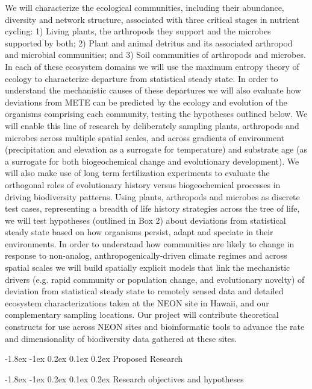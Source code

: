 \documentclass[11pt]{article}
\makeatletter
\renewcommand\section{\@startsection{section}{1}{\z@}%
                                  {-1.8ex \@plus -1ex \@minus 0.2ex}%
                                  {0.1ex \@plus 0.2ex}%
                                  {\normalfont\Large\bfseries}}
\renewcommand\subsection{\@startsection{subsection}{1}{\z@}%
                                  {-1.8ex \@plus -1ex \@minus 0.2ex}%
                                  {0.1ex \@plus 0.2ex}%
                                  {\normalfont\large\bfseries}}
\makeatother
\begin{document}
We will characterize the ecological communities, including their
abundance, diversity and network structure, associated with three
critical stages in nutrient cycling: 1) Living plants, the arthropods
they support and the microbes supported by both; 2) Plant and animal
detritus and its associated arthropod and microbial communities; and
3) Soil communities of arthropods and microbes.  In each of these
ecosystem domains we will use the maximum entropy theory of ecology to
characterize departure from statistical steady state.  In order to
understand the mechanistic causes of these departures we will also
evaluate how deviations from METE can be predicted by the ecology and
evolution of the organisms comprising each community, testing the
hypotheses outlined below.  We will enable this line of research by
deliberately sampling plants, arthropods and microbes across multiple
spatial scales, and across gradients of environment (precipitation and
elevation as a surrogate for temperature) and substrate age (as a
surrogate for both biogeochemical change and evolutionary
development).  We will also make use of long term fertilization
experiments \citep{vitousek1997nutrient} to evaluate the orthogonal
roles of evolutionary history versus biogeochemical processes in
driving biodiversity patterns.  Using plants, arthropods and microbes
as discrete test cases, representing a breadth of life history
strategies across the tree of life, we will test hypotheses (outlined
in Box 2) about deviations from statistical steady state based on how
organisms persist, adapt and speciate in their environments.  In order
to understand how communities are likely to change in response to
non-analog, anthropogenically-driven climate regimes and across
spatial scales we will build spatially explicit models that link the
mechanistic drivers (e.g. rapid community or population change, and
evolutionary novelty) of deviation from statistical steady state to
remotely sensed data and detailed ecosystem characterizations taken at
the NEON site in Hawaii, and our complementary sampling locations. Our
project will contribute theoretical constructs for use across NEON
sites and bioinformatic tools to advance the rate and dimensionality
of biodiversity data gathered at these sites.

\section{Proposed Research}

\subsection{Research objectives and hypotheses}
\end{document}
